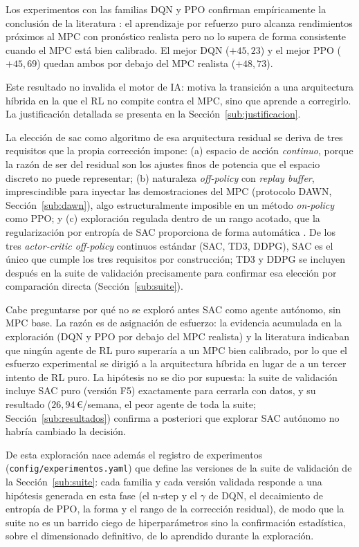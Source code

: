 \documentclass[12pt, a4paper, twoside]{report}
\begin{document}
Los experimentos con las familias DQN y PPO confirman empíricamente la
conclusión de la literatura \citep{Zhan2023}: el aprendizaje por refuerzo puro
alcanza rendimientos próximos al MPC con pronóstico realista pero no lo supera
de forma consistente cuando el MPC está bien calibrado. El mejor DQN
($+45{,}23$) y el mejor PPO ($+45{,}69$) quedan ambos por debajo del MPC
realista ($+48{,}73$).

Este resultado no invalida el motor de IA: motiva la transición a una
arquitectura híbrida en la que el RL no compite contra el MPC, sino que aprende
a corregirlo. La justificación detallada se presenta en la
Sección~\ref{sub:justificacion}.

La elección de \acrshort{sac} como algoritmo de esa arquitectura residual se
deriva de tres requisitos que la propia corrección impone: (a) espacio de
acción \emph{continuo}, porque la razón de ser del residual son los ajustes
finos de potencia que el espacio discreto no puede representar; (b) naturaleza
\emph{off-policy} con \textit{replay buffer}, imprescindible para inyectar las
demostraciones del MPC (protocolo DAWN, Sección~\ref{sub:dawn}), algo
estructuralmente imposible en un método \textit{on-policy} como PPO; y (c)
exploración regulada dentro de un rango acotado, que la regularización por
entropía de SAC proporciona de forma automática \citep{Haarnoja2018}. De los
tres \textit{actor-critic off-policy} continuos estándar (SAC, TD3, DDPG),
SAC es el único que cumple los tres requisitos por construcción; TD3 y DDPG
se incluyen después en la suite de validación precisamente para confirmar esa
elección por comparación directa (Sección~\ref{sub:suite}).

Cabe preguntarse por qué no se exploró antes SAC como agente autónomo, sin
MPC base. La razón es de asignación de esfuerzo: la evidencia acumulada en la
exploración (DQN y PPO por debajo del MPC realista) y la literatura
\citep{Zhan2023} indicaban que ningún agente de RL puro superaría a un MPC
bien calibrado, por lo que el esfuerzo experimental se dirigió a la
arquitectura híbrida en lugar de a un tercer intento de RL puro. La hipótesis
no se dio por supuesta: la suite de validación incluye SAC puro (versión F5)
exactamente para cerrarla con datos, y su resultado ($26{,}94$\,€/semana, el
peor agente de toda la suite; Sección~\ref{sub:resultados}) confirma a
posteriori que explorar SAC autónomo no habría cambiado la decisión.

De esta exploración nace además el registro de experimentos
(\texttt{config/experimentos.yaml}) que define las versiones de la suite de
validación de la Sección~\ref{sub:suite}: cada familia y cada versión validada
responde a una hipótesis generada en esta fase (el n-step y el $\gamma$ de DQN,
el decaimiento de entropía de PPO, la forma y el rango de la corrección
residual), de modo que la suite no es un barrido ciego de hiperparámetros sino
la confirmación estadística, sobre el dimensionado definitivo, de lo aprendido
durante la exploración.
\end{document}
